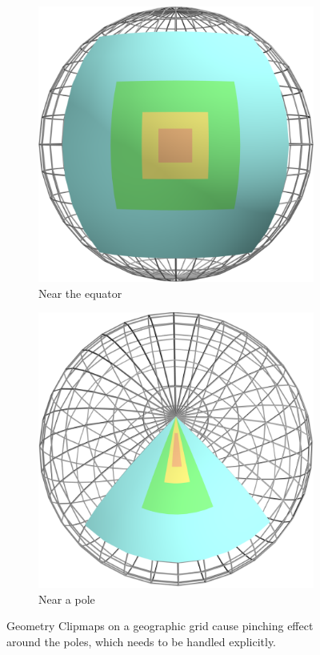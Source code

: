 \begin{figure}[htbp]
    \centering
    \begin{subfigure}[bt]{0.35\textwidth}
        \includegraphics[width=\textwidth]{figures/geometryclipmap/clipmap1.png}
        \caption{Near the equator}
    \end{subfigure}
    \quad
    \begin{subfigure}[bt]{0.35\textwidth}
        \includegraphics[width=\textwidth]{figures/geometryclipmap/clipmap2.png}
        \caption{Near a pole}
    \end{subfigure}
    \caption{Geometry Clipmaps on a geographic grid cause pinching effect around the poles, which needs to be handled explicitly.}
    \label{fig:mipclip}
\end{figure}

